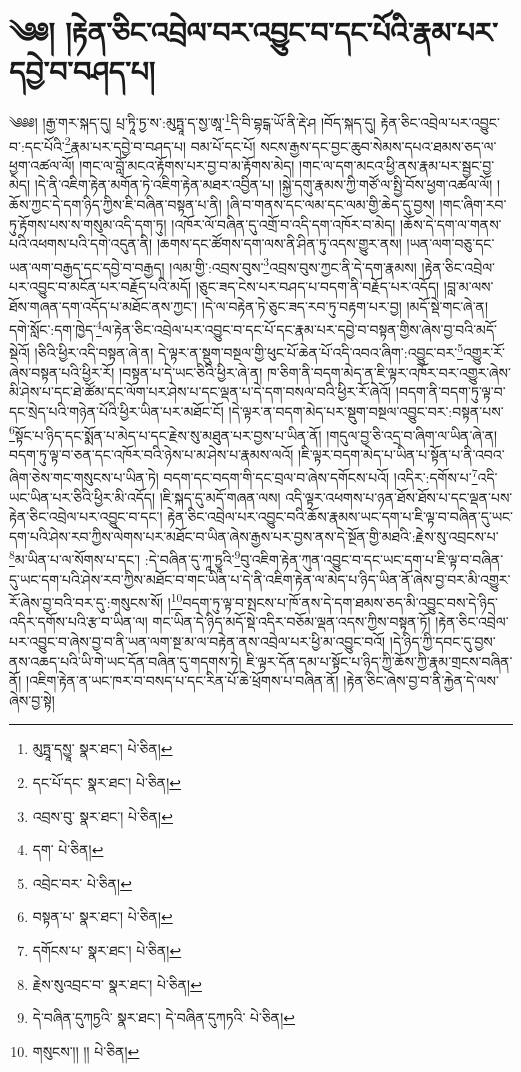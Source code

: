 \setcounter{footnote}{0} 
\chapter{༄༅། །རྟེན་ཅིང་འབྲེལ་བར་འབྱུང་བ་དང་པོའི་རྣམ་པར་དབྱེ་བ་བཤད་པ།}༄༅༅། །རྒྱ་གར་སྐད་དུ། པྲ་ཏཱི་ཏྱ་ས་:མུཏྤཱ་ད་སྱ་ཨཱ་\footnote{མུཏྤཱ་དསྱཱ་  སྣར་ཐང་།  པེ་ཅིན། }དི་བི་བྷངྒ་ཡོ་ནི་རྡེ་ཤ །བོད་སྐད་དུ། རྟེན་ཅིང་འབྲེལ་པར་འབྱུང་བ་:དང་པོའི་\footnote{དང་པོ་དང་  སྣར་ཐང་།  པེ་ཅིན། }རྣམ་པར་དབྱེ་བ་བཤད་པ། བམ་པོ་དང་པོ། སངས་རྒྱས་དང་བྱང་ཆུབ་སེམས་དཔའ་ཐམས་ཅད་ལ་ཕྱག་འཚལ་ལོ། །གང་ལ་བློ་མངའ་རྟོགས་པར་བྱ་བ་མ་རྟོགས་མེད། །གང་ལ་དག་མངའ་ཕྱི་ནས་རྣམ་པར་སྦྱང་བྱ་མེད། །དེ་ནི་འཇིག་རྟེན་མགོན་ཏེ་འཇིག་རྟེན་མཐར་འབྱིན་པ། །སྐྱེ་དགུ་རྣམས་ཀྱི་གཙོ་ལ་སྤྱི་བོས་ཕྱག་འཚལ་ལོ། །ཆོས་ཀྱང་དེ་དག་ཉིད་ཀྱིས་ཇི་བཞིན་བསྟན་པ་ནི། །ཞི་བ་གནས་དང་ལམ་དང་ལམ་གྱི་ཆེད་དུ་བྱས། །གང་ཞིག་རབ་ཏུ་རྟོགས་པས་ས་གསུམ་འདི་དག་ཏུ། །འཁོར་ལོ་བཞིན་དུ་འགྲོ་བ་འདི་དག་འཁོར་བ་མེད། །ཆོས་དེ་དག་ལ་གནས་པའི་འཕགས་པའི་དགེ་འདུན་ནི། །ཆགས་དང་ཚོགས་དག་ལས་ནི་ཤིན་ཏུ་འདས་གྱུར་ནས། །ཡན་ལག་བཅུ་དང་ཡན་ལག་བརྒྱད་དང་དབྱེ་བ་བརྒྱད། །ལམ་གྱི་:འབྲས་བུས་\footnote{འབྲས་བུ་  སྣར་ཐང་།  པེ་ཅིན། }འབྲས་བུས་ཀྱང་ནི་དེ་དག་རྣམས། །རྟེན་ཅིང་འབྲེལ་པར་འབྱུང་བ་མངོན་པར་བརྗོད་པའི་མདོ། །ཅུང་ཟད་ངེས་པར་བཤད་པ་བདག་ནི་བརྗོད་པར་འདོད། །བླ་མ་ལས་ཐོས་གཞན་དག་འདོད་པ་མཐོང་ནས་ཀྱང་། །དེ་ལ་བརྟེན་ཏེ་ཅུང་ཟད་རབ་ཏུ་བརྟག་པར་བྱ། །མདོ་སྡེ་གང་ཞེ་ན། དགེ་སློང་:དག་ཁྱེད་\footnote{དག་  པེ་ཅིན། }ལ་རྟེན་ཅིང་འབྲེལ་པར་འབྱུང་བ་དང་པོ་དང་རྣམ་པར་དབྱེ་བ་བསྟན་གྱིས་ཞེས་བྱ་བའི་མདོ་སྡེའོ། །ཅིའི་ཕྱིར་འདི་བསྟན་ཞེ་ན། དེ་ལྟར་ན་སྡུག་བསྔལ་གྱི་ཕུང་པོ་ཆེན་པོ་འདི་འབའ་ཞིག་:འབྱུང་བར་\footnote{འབྲེང་བར་  པེ་ཅིན། }འགྱུར་རོ་ཞེས་བསྟན་པའི་ཕྱིར་རོ། །བསྟན་པ་དེ་ཡང་ཅིའི་ཕྱིར་ཞེ་ན། ཁ་ཅིག་ནི་བདག་མེད་ན་ཇི་ལྟར་འཁོར་བར་འགྱུར་ཞེས་མི་ཤེས་པ་དང་ཐེ་ཚོམ་དང་ལོག་པར་ཤེས་པ་དང་ལྡན་པ་དེ་དག་བསལ་བའི་ཕྱིར་རོ་ཞེའོ། །བདག་ནི་བདག་ཏུ་ལྟ་བ་དང་སྲེད་པའི་གཉེན་པོའི་ཕྱིར་ཡིན་པར་མཐོང་ངོ། །དེ་ལྟར་ན་བདག་མེད་པར་སྡུག་བསྔལ་འབྱུང་བར་:བསྟན་པས་\footnote{བསྟན་པ་  སྣར་ཐང་།  པེ་ཅིན། }སྟོང་པ་ཉིད་དང་སྨོན་པ་མེད་པ་དང་རྗེས་སུ་མཐུན་པར་བྱས་པ་ཡིན་ནོ། །གདུལ་བྱ་ཅི་འདྲ་བ་ཞིག་ལ་ཡིན་ཞེ་ན། བདག་ཏུ་ལྟ་བ་ཅན་དང་འཁོར་བའི་ཉེས་པ་མ་ཤེས་པ་རྣམས་ལའོ། །ཇི་ལྟར་བདག་མེད་པ་ཡིན་པ་སྟོན་པ་ནི་འབའ་ཞིག་ཅེས་གང་གསུངས་པ་ཡིན་ཏེ། བདག་དང་བདག་གི་དང་བྲལ་བ་ཞེས་དགོངས་པའོ། །འདིར་:དགོས་པ་\footnote{དགོངས་པ་  སྣར་ཐང་།  པེ་ཅིན། }འདི་ཡང་ཡིན་པར་ཅིའི་ཕྱིར་མི་འདོད། །ཇི་སྐད་དུ་མདོ་གཞན་ལས། འདི་ལྟར་འཕགས་པ་ཉན་ཐོས་ཐོས་པ་དང་ལྡན་པས་རྟེན་ཅིང་འབྲེལ་པར་འབྱུང་བ་དང་། རྟེན་ཅིང་འབྲེལ་པར་འབྱུང་བའི་ཆོས་རྣམས་ཡང་དག་པ་ཇི་ལྟ་བ་བཞིན་དུ་ཡང་དག་པའི་ཤེས་རབ་ཀྱིས་ལེགས་པར་མཐོང་བ་ཡིན་ཞེས་རྒྱས་པར་བྱས་ནས་དེ་སྔོན་གྱི་མཐའི་:རྗེས་སུ་འབྲངས་པ་\footnote{རྗེས་སུའབྲང་བ་  སྣར་ཐང་།  པེ་ཅིན། }མ་ཡིན་པ་ལ་སོགས་པ་དང་། :དེ་བཞིན་དུ་ཀཱ་ཏྱཱའི་\footnote{དེ་བཞིན་དུཀཏྱའི་  སྣར་ཐང་། དེ་བཞིན་དུཀཏའི་  པེ་ཅིན། }བུ་འཇིག་རྟེན་ཀུན་འབྱུང་བ་དང་ཡང་དག་པ་ཇི་ལྟ་བ་བཞིན་དུ་ཡང་དག་པའི་ཤེས་རབ་ཀྱིས་མཐོང་བ་གང་ཡིན་པ་དེ་ནི་འཇིག་རྟེན་ལ་མེད་པ་ཉིད་ཡིན་ནོ་ཞེས་བྱ་བར་མི་འགྱུར་རོ་ཞེས་བྱ་བའི་བར་དུ་:གསུངས་སོ། །\footnote{གསུངས་།། །།  པེ་ཅིན། }བདག་ཏུ་ལྟ་བ་སྤངས་པ་ཁོ་ནས་དེ་དག་ཐམས་ཅད་མི་འབྱུང་བས་དེ་ཉིད་འདིར་དགོས་པའི་རྩ་བ་ཡིན་ལ། གང་ཡིན་དེ་ཉིད་མདོ་སྡེ་འདིར་བཅོམ་ལྡན་འདས་ཀྱིས་བསྟན་ཏོ། །རྟེན་ཅིང་འབྲེལ་པར་འབྱུང་བ་ཞེས་བྱ་བ་ནི་ཡན་ལག་སྔ་མ་ལ་བརྟེན་ནས་འབྲེལ་པར་ཕྱི་མ་འབྱུང་བའོ། །དེ་ཉིད་ཀྱི་དབང་དུ་བྱས་ནས་འཆད་པའི་ཡི་གེ་ཡང་དོན་བཞིན་དུ་གདགས་ཏེ། ཇི་ལྟར་དོན་དམ་པ་སྟོང་པ་ཉིད་ཀྱི་ཆོས་ཀྱི་རྣམ་གྲངས་བཞིན་ནོ། །འཇིག་རྟེན་ན་ཡང་ཁར་བ་བསད་པ་དང་རིན་པོ་ཆེ་ཕྲོགས་པ་བཞིན་ནོ། །རྟེན་ཅིང་ཞེས་བྱ་བ་ནི་རྐྱེན་དེ་ལས་ཞེས་བྱ་སྟེ། 